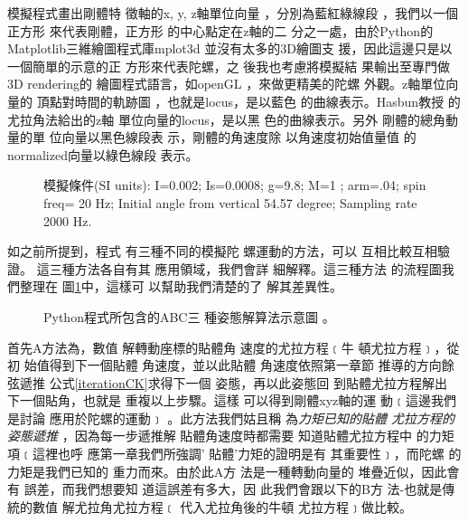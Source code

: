 \documentclass[12pt,twoside]{article}
\begin{document}
模擬程式畫出剛體特%
徵軸的x, y, z軸單位向量%
，分別為藍紅綠線段%
，我們以一個正方形%
來代表剛體，正方形%
的中心點定在z軸的二%
分之一處，由於Python的%
Matplotlib三維繪圖程式庫mplot3d%
並沒有太多的3D繪圖支%
援，因此這邊只是以%
一個簡單的示意的正%
方形來代表陀螺，之%
後我也考慮將模擬結%
果輸出至專門做3D rendering的%
繪圖程式語言，如openGL%
，來做更精美的陀螺%
外觀。z軸單位向量的%
頂點對時間的軌跡圖%
，也就是locus，是以藍色%
的曲線表示。Hasbun教授%
的尤拉角法給出的z軸%
單位向量的locus，是以黑%
色的曲線表示。另外%
剛體的總角動量的單%
位向量以黑色線段表%
示，剛體的角速度除%
以角速度初始值量值%
的normalized向量以綠色線段%
表示。

\begin{figure}[th]
\caption{模擬條件(SI units): I=0.002; Is=0.0008;
g=9.8; M=1 ; arm=.04; spin freq= 20 Hz; Initial angle from vertical 54.57
degree; Sampling rate 2000 Hz.}
\begin{center}
\fbox{}
\end{center}
\end{figure}

如之前所提到，程式%
有三種不同的模擬陀%
螺運動的方法，可以%
互相比較互相驗證。%
這三種方法各自有其%
應用領域，我們會詳%
細解釋。這三種方法%
的流程圖我們整理在%
圖\ref{ABCmethodsIllustration}中，這樣可%
以幫助我們清楚的了%
解其差異性。

\begin{figure}[tph]
\caption{Python程式所包含的ABC三%
種姿態解算法示意圖%
。}
\begin{center}

\end{center}
\label{ABCmethodsIllustration}
\end{figure}

\bigskip 首先A方法為，數值%
解轉動座標的貼體角%
速度的尤拉方程﹝牛%
頓尤拉方程﹞，從初%
始值得到下一個貼體%
角速度，並以此貼體%
角速度依照第一章節%
推導的方向餘弦遞推%
公式\ref{iterationCK}求得下一個%
姿態，再以此姿態回%
到貼體尤拉方程解出%
下一個貼角，也就是%
重複以上步驟。這樣%
可以得到剛體xyz軸的運%
動﹝這邊我們是討論%
應用於陀螺的運動﹞%
。此方法我們姑且稱%
為\emph{力矩已知的貼體%
尤拉方程的姿態遞推}%
，因為每一步遞推解%
貼體角速度時都需要%
知道貼體尤拉方程中%
的力矩項﹝這裡也呼%
應第一章我們所強調'%
貼體'力矩的證明是有%
其重要性﹞，而陀螺%
的力矩是我們已知的%
重力而來。由於此A方%
法是一種轉動向量的%
堆疊近似，因此會有%
誤差，而我們想要知%
道這誤差有多大，因%
此我們會跟以下的B方%
法-也就是傳統的數值%
解尤拉角尤拉方程﹝%
代入尤拉角後的牛頓%
尤拉方程﹞做比較。

\bigskip 
\end{document}
